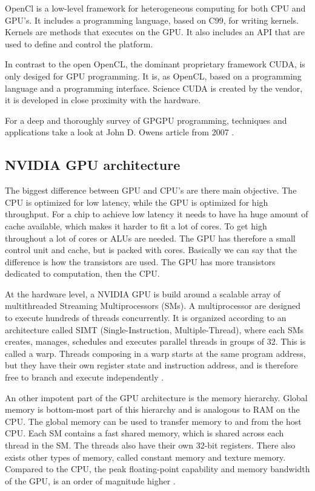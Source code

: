 OpenCl is a low-level framework for heterogeneous computing for both CPU and GPU's. It includes a programming language, based on C99, for writing kernels. Kernels are methods that executes on the GPU\@. It also includes an API that are used to define and control the platform.

In contrast to the open OpenCL, the dominant proprietary framework CUDA\@, is only desiged for GPU programming. It is, as OpenCL, based on a programming language and a programming interface. Science CUDA is created by the vendor, it is developed in close proximity with the hardware.

For a deep and thoroughly survey of GPGPU programming, techniques and applications take a look at John D. Owens article from 2007 \citep{Owens:2007:ASO}.

\subsection{NVIDIA GPU architecture} %
\label{ssub:nvidia_gpu_architecture}

The biggest difference between GPU and CPU's are there main objective. The CPU is optimized for low latency, while the GPU is optimized for high throughput. For a chip to achieve low latency it needs to have ha huge amount of cache available, which makes it harder to fit a lot of cores. To get high throughout a lot of cores or ALUs are needed. The GPU has therefore a small control unit and cache, but is packed with cores. Basically we can say that the difference is how the transistors are used. The GPU has more transistors dedicated to computation, then the CPU\@.

At the hardware level, a NVIDIA GPU is build around a scalable array of multithreaded Streaming Multiprocessors (SMs). A multiprocessor are designed to execute hundreds of threads concurrently. It is organized according to an architecture called SIMT (Single-Instruction, Multiple-Thread), where each SMs creates, manages, schedules and executes parallel threads in groups of 32. This is called a warp. Threads composing in a warp starts at the same program address, but they have their own register state and instruction address, and is therefore free to branch and execute independently \citep{cuda_programming_guide}.

An other impotent part of the GPU architecture is the memory hierarchy. Global memory is bottom-most part of this hierarchy and is analogous to RAM on the CPU\@. The global memory can be used to transfer memory to and from the host CPU\@. Each SM contains a fast shared memory, which is shared across each thread in the SM\@. The threads also have their own 32-bit registers. There also exists other types of memory, called constant memory and texture memory. Compared to the CPU, the peak floating-point capability and memory bandwidth of the GPU, is an order of magnitude higher \citep{Liangcu}.


